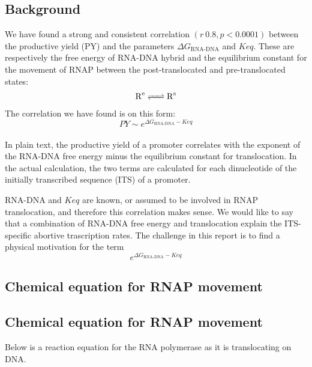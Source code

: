 \documentclass[a4paper]{article}
\begin{document}
 
\noindent

\subsection{Background}
We have found a strong and consistent correlation $(r ~ 0.8, p < 0.0001)$
between the productive yield (PY) and the parameters $\Delta
G_{\text{RNA-DNA}}$ and $Keq$.  These are respectively the free energy of
RNA-DNA hybrid and the equilibrium constant for the movement of RNAP between
the post-translocated and pre-translocated states:
\\
\begin{align}
\ce{R^{\text{e}}
<=>
R^{\text{s}}
}
\end{align}
The correlation we have found is on this form:
\\
\begin{equation*}
	PY \sim e^{\Delta G_{\text{RNA-DNA}} - Keq}
\end{equation*}
\\
In plain text, the productive yield of a promoter correlates with the exponent
of the RNA-DNA free energy minus the equilibrium constant for translocation.
In the actual calculation, the two terms are calculated for each dinucleotide
of the initially transcribed sequence (ITS) of a promoter.

$\text{RNA-DNA}$ and $Keq$ are known, or assumed to be involved in RNAP translocation,
and therefore this correlation makes sense. We would like to say that a
combination of RNA-DNA free energy and translocation explain the ITS-specific
abortive trascription rates. The challenge in this report is to find a physical
motivation for the term
\begin{equation*}
	e^{\Delta G_{\text{RNA-DNA}} - Keq}
\end{equation*}

\subsection{Chemical equation for RNAP movement}
\subsection{Chemical equation for RNAP movement}

Below is a reaction equation for the RNA polymerase as it is translocating on DNA.
\end{document}
